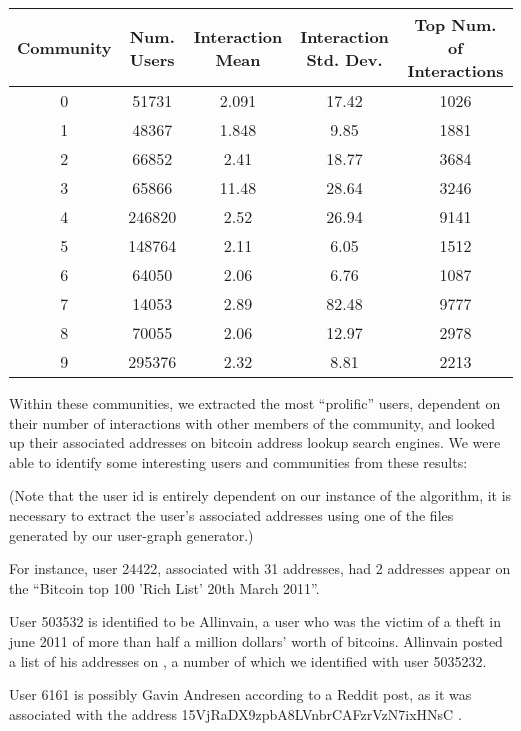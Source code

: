 \documentclass{article}
\begin{document}
\bigskip

\begin{tabular}{|c|c|c|c|c|}
\hline
Community & Num. Users & Interaction Mean & Interaction Std. Dev. & Top Num. of Interactions \\
\hline
\hline
 0 & 51731 & 2.091 & 17.42 & 1026 \\
\hline
 1 & 48367 & 1.848 & 9.85 & 1881 \\
\hline
 2 & 66852 & 2.41 & 18.77 & 3684 \\
 \hline
 3 & 65866 & 11.48 & 28.64 & 3246 \\
 \hline
 4 & 246820 & 2.52 & 26.94 & 9141 \\
 \hline
 5 & 148764 & 2.11 & 6.05 & 1512 \\
 \hline
 6 & 64050 & 2.06 & 6.76 & 1087 \\
 \hline
 7 & 14053 & 2.89 & 82.48 & 9777 \\
 \hline
 8 & 70055 & 2.06 & 12.97 & 2978 \\
\hline
 9 & 295376 & 2.32 & 8.81 & 2213 \\
 \hline

\end{tabular}

\bigskip

Within these communities, we extracted the most ``prolific'' users, dependent on 
their number of interactions with other members of the community, 
and looked up their associated addresses on bitcoin address lookup search engines. 
We were able to identify some interesting users and communities from these results:

(Note that the user id is entirely dependent on our instance of the algorithm, 
it is necessary to extract the user's associated addresses using one of the files generated 
by our user-graph generator.)

For instance, user 24422, associated with 31 addresses, had 2 addresses appear on the 
``Bitcoin top 100 'Rich List' 20th March 2011''\cite{rich}.

User 503532 is identified to be Allinvain, a user who was the victim of a theft in june 2011 
of more than half a million dollars' worth of bitcoins\cite{allinvain}. Allinvain posted a list of his 
addresses on \cite{address list}, a number of which we identified with user 5035232.

User 6161 is possibly Gavin Andresen according to a Reddit post\cite{reddit}, as it 
was associated with the address 15VjRaDX9zpbA8LVnbrCAFzrVzN7ixHNsC .
\end{document}
